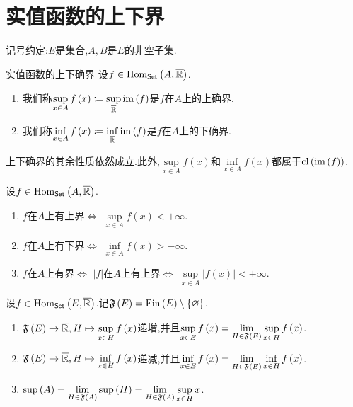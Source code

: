 \section{实值函数的上下界}

记号约定:$E$是集合,$A,B$是$E$的非空子集.

\begin{definition}{实值函数的上下确界}{}
	设$f\in\operatorname{Hom}_{\mathsf{Set}}\left(A,\overline{\mathbb{R}}\right)$.
	\begin{enumerate}
		\item 我们称$\sup\limits_{x\in A}f\left(x\right)\coloneq\sup\limits_{\overline{\mathbb{R}}}\operatorname{im}\left(f\right)$是$f$在$A$上的上确界.
		\item 我们称$\inf\limits_{x\in A}f\left(x\right)\coloneq\inf\limits_{\overline{\mathbb{R}}}\operatorname{im}\left(f\right)$是$f$在$A$上的下确界.
	\end{enumerate}
\end{definition}

\begin{remark}{}{}
	上下确界的其余性质依然成立.此外,$\sup\limits_{x\in A}f\left(x\right)$和$\inf\limits_{x\in A}f\left(x\right)$都属于$\operatorname{cl}\left(\operatorname{im}\left(f\right)\right)$.
\end{remark}

\begin{proposition}{}{}
	设$f\in\operatorname{Hom}_{\mathsf{Set}}\left(A,\overline{\mathbb{R}}\right)$.
	\begin{enumerate}
		\item $f$在$A$上有上界$\iff$ $\sup\limits_{x\in A}f\left(x\right)<+\infty$.
		\item $f$在$A$上有下界$\iff$ $\inf\limits_{x\in A}f\left(x\right)>-\infty$.
		\item $f$在$A$上有界$\iff$ $\left|f\right|$在$A$上有上界$\iff$ $\sup\limits_{x\in A}\left|f\left(x\right)\right|<+\infty$.
	\end{enumerate}
\end{proposition}

\begin{proposition}{}{}
	设$f\in\operatorname{Hom}_{\mathsf{Set}}\left(E,\overline{\mathbb{R}}\right)$.记$\mathfrak{F}\left(E\right)=\operatorname{Fin}\left(E\right)\setminus\left\{\varnothing\right\}$.
	\begin{enumerate}
		\item $\mathfrak{F}\left(E\right)\to\overline{\mathbb{R}},H\mapsto\sup\limits_{x\in H}f\left(x\right)$递增,并且$\sup\limits_{x\in E}f\left(x\right)=\displaystyle\lim_{H\in\mathfrak{F}\left(E\right)}\sup\limits_{x\in H}f\left(x\right)$.
		\item $\mathfrak{F}\left(E\right)\to\overline{\mathbb{R}},H\mapsto\inf\limits_{x\in H}f\left(x\right)$递减,并且$\inf\limits_{x\in E}f\left(x\right)=\displaystyle\lim_{H\in\mathfrak{F}\left(E\right)}\inf\limits_{x\in H}f\left(x\right)$.
		\item $\sup\left(A\right)=\displaystyle\lim_{H\in\mathfrak{F}\left(A\right)}\sup\left(H\right)=\displaystyle\lim_{H\in\mathfrak{F}\left(A\right)}\sup\limits_{x\in H}x$.
	\end{enumerate}
\end{proposition}

